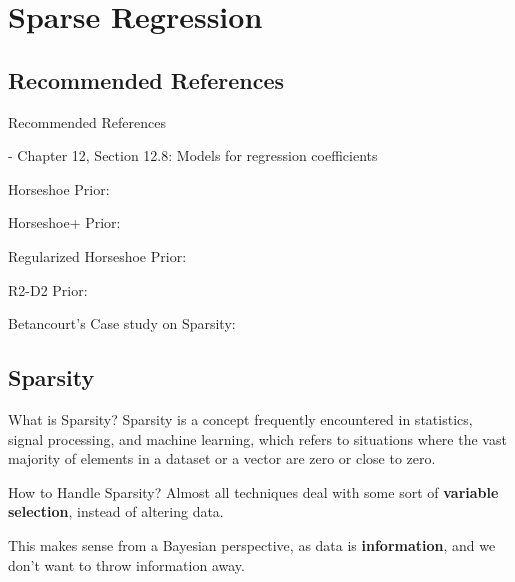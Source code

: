 \section{Sparse Regression}

\subsection{Recommended References}
\begin{frame}{Recommended References}
	\begin{vfilleditems}
		\item \textcite{gelman2020regression} - Chapter 12, Section 12.8: Models for regression coefficients
		\item Horseshoe Prior: \textcite{carvalho2009handling}
		\item Horseshoe+ Prior: \textcite{bhadra2015horseshoe}
        \item Regularized Horseshoe Prior: \textcite{piironen2017horseshoe}
        \item R2-D2 Prior: \textcite{zhang2022bayesian}
        \item Betancourt's Case study on Sparsity: \textcite{betancourtSparsityBlues2021}
	\end{vfilleditems}
\end{frame}

\subsection{Sparsity}
\begin{frame}{What is Sparsity?}
    Sparsity is a concept frequently encountered in statistics, signal processing,
    and machine learning, which refers to situations where the vast majority of
    elements in a dataset or a vector are zero or close to zero. 
\end{frame}

\begin{frame}{How to Handle Sparsity?}
    Almost all techniques deal with some sort of \textbf{variable selection},
    instead of altering data.

    This makes sense from a Bayesian perspective,
    as data is \textbf{information},
    and we don't want to throw information away.
\end{frame}

